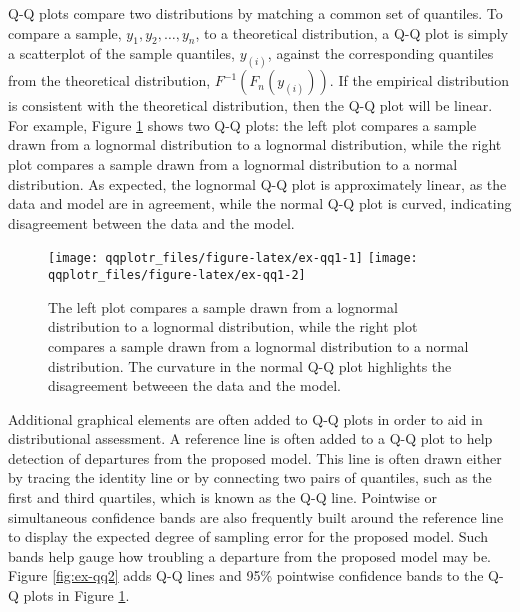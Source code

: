 Q-Q plots compare two distributions by matching a common set of
quantiles. To compare a sample, \(y_1, y_2, \ldots, y_n\), to a
theoretical distribution, a Q-Q plot is simply a scatterplot of the
sample quantiles, \(y_{(i)}\), against the corresponding quantiles from
the theoretical distribution, \(F^{-1}\left( F_n(y_{(i)}) \right)\). If
the empirical distribution is consistent with the theoretical
distribution, then the Q-Q plot will be linear. For example, Figure
\ref{fig:ex-qq1} shows two Q-Q plots: the left plot compares a sample
drawn from a lognormal distribution to a lognormal distribution, while
the right plot compares a sample drawn from a lognormal distribution to
a normal distribution. As expected, the lognormal Q-Q plot is
approximately linear, as the data and model are in agreement, while the
normal Q-Q plot is curved, indicating disagreement between the data and
the model.

\begin{Schunk}
\begin{figure}

{\centering \texttt{[image: qqplotr\_files/figure-latex/ex-qq1-1]} \texttt{[image: qqplotr\_files/figure-latex/ex-qq1-2]} 

}

\caption[The left plot compares a sample drawn from a lognormal distribution to a lognormal distribution, while the right plot compares a sample drawn from a lognormal distribution to a normal distribution]{The left plot compares a sample drawn from a lognormal distribution to a lognormal distribution, while the right plot compares a sample drawn from a lognormal distribution to a normal distribution. The curvature in the normal Q-Q plot highlights the disagreement betweeen the data and the model.}\label{fig:ex-qq1}
\end{figure}
\end{Schunk}

Additional graphical elements are often added to Q-Q plots in order to
aid in distributional assessment. A reference line is often added to a
Q-Q plot to help detection of departures from the proposed model. This
line is often drawn either by tracing the identity line or by connecting
two pairs of quantiles, such as the first and third quartiles, which is
known as the Q-Q line. Pointwise or simultaneous confidence bands are
also frequently built around the reference line to display the expected
degree of sampling error for the proposed model. Such bands help gauge
how troubling a departure from the proposed model may be. Figure
\ref{fig:ex-qq2} adds Q-Q lines and 95\% pointwise confidence bands to
the Q-Q plots in Figure \ref{fig:ex-qq1}.

